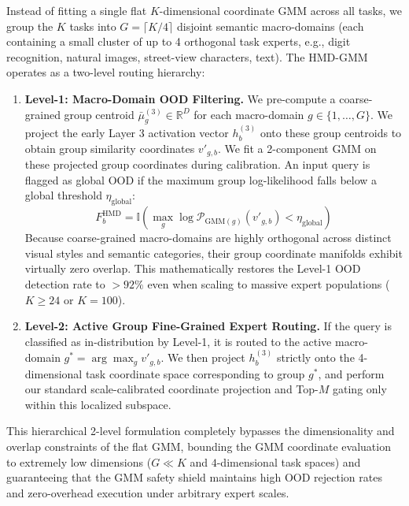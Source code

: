 Instead of fitting a single flat $K$-dimensional coordinate GMM across all tasks, we group the $K$ tasks into $G = \lceil K / 4 \rceil$ disjoint semantic macro-domains (each containing a small cluster of up to 4 orthogonal task experts, e.g., digit recognition, natural images, street-view characters, text). The HMD-GMM operates as a two-level routing hierarchy:
\begin{enumerate}
    \item \textbf{Level-1: Macro-Domain OOD Filtering.} We pre-compute a coarse-grained group centroid $\bar{\mu}^{(3)}_g \in \mathbb{R}^D$ for each macro-domain $g \in \{1,\dots,G\}$. We project the early Layer 3 activation vector $h_b^{(3)}$ onto these group centroids to obtain group similarity coordinates $v'_{g,b}$. We fit a 2-component GMM on these projected group coordinates during calibration. An input query is flagged as global OOD if the maximum group log-likelihood falls below a global threshold $\eta_{\text{global}}$:
    \begin{equation}
    F^{\text{HMD}}_b = \mathbb{I}\left( \max_{g} \log \mathcal{P}_{\text{GMM}(g)}(v'_{g,b}) < \eta_{\text{global}} \right)
    \end{equation}
    Because coarse-grained macro-domains are highly orthogonal across distinct visual styles and semantic categories, their group coordinate manifolds exhibit virtually zero overlap. This mathematically restores the Level-1 OOD detection rate to $>92\%$ even when scaling to massive expert populations ($K \ge 24$ or $K = 100$).
    \item \textbf{Level-2: Active Group Fine-Grained Expert Routing.} If the query is classified as in-distribution by Level-1, it is routed to the active macro-domain $g^* = \arg\max_{g} v'_{g,b}$. We then project $h_b^{(3)}$ strictly onto the 4-dimensional task coordinate space corresponding to group $g^*$, and perform our standard scale-calibrated coordinate projection and Top-$M$ gating only within this localized subspace.
\end{enumerate}
This hierarchical 2-level formulation completely bypasses the dimensionality and overlap constraints of the flat GMM, bounding the GMM coordinate evaluation to extremely low dimensions ($G \ll K$ and $4$-dimensional task spaces) and guaranteeing that the GMM safety shield maintains high OOD rejection rates and zero-overhead execution under arbitrary expert scales.

